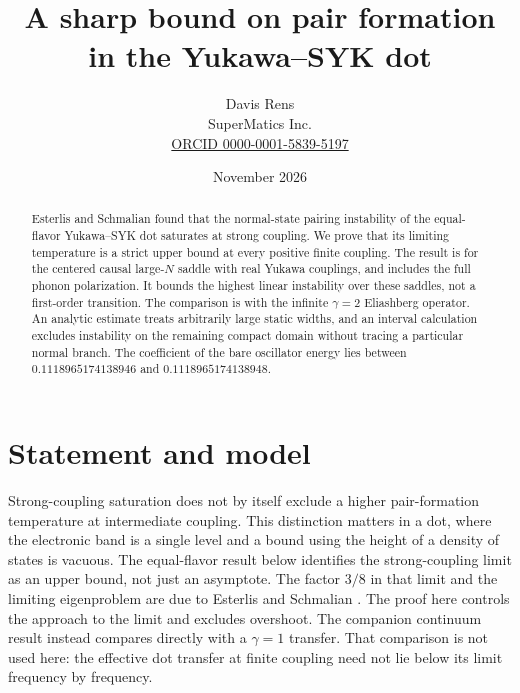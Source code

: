 \documentclass[11pt]{article}
\title{A sharp bound on pair formation in the Yukawa--SYK dot}
\author{Davis Rens\\SuperMatics Inc.\\\href{https://orcid.org/0000-0001-5839-5197}{ORCID 0000-0001-5839-5197}}
\date{November 2026}
\begin{document}
\maketitle
\begin{abstract}
Esterlis and Schmalian found that the normal-state pairing instability of the equal-flavor Yukawa--SYK dot saturates at strong coupling. We prove that its limiting temperature is a strict upper bound at every positive finite coupling. The result is for the centered causal large-$N$ saddle with real Yukawa couplings, and includes the full phonon polarization. It bounds the highest linear instability over these saddles, not a first-order transition. The comparison is with the infinite $\gamma=2$ Eliashberg operator. An analytic estimate treats arbitrarily large static widths, and an interval calculation excludes instability on the remaining compact domain without tracing a particular normal branch. The coefficient of the bare oscillator energy lies between $0.1118965174138946$ and $0.1118965174138948$.
\end{abstract}

\section{Statement and model}
Strong-coupling saturation does not by itself exclude a higher pair-formation temperature at intermediate coupling. This distinction matters in a dot, where the electronic band is a single level and a bound using the height of a density of states is vacuous. The equal-flavor result below identifies the strong-coupling limit as an upper bound, not just an asymptote. The factor $3/8$ in that limit and the limiting eigenproblem are due to Esterlis and Schmalian \cite[Eq.~(35)--(37)]{ES}. The proof here controls the approach to the limit and excludes overshoot. The companion continuum result \cite{Continuum} instead compares directly with a $\gamma=1$ transfer. That comparison is not used here: the effective dot transfer at finite coupling need not lie below its limit frequency by frequency.
\end{document}
